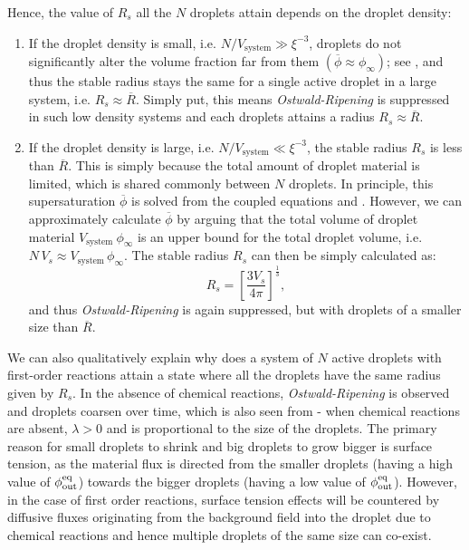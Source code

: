 Hence, the value of $R_s$ all the $N$ droplets attain depends on the droplet density:
\begin{enumerate}
    \item If the droplet density is small, i.e. $N / V_\mathrm{system} \gg \xi ^ {-3}$, droplets do not significantly alter the volume fraction far from them $(\overline{\phi} \approx \phi_\infty)$; see , and thus the stable radius stays the same for a single active droplet in a large system, i.e. $R_s \approx \overline{R}$.
    Simply put, this means \textit{Ostwald-Ripening} is suppressed in such low density systems and each droplets attains a radius $R_s \approx \overline{R}$.

    \item If the droplet density is large, i.e. $N / V_\mathrm{system} \ll \xi ^ {-3}$, the stable radius $R_s$ is less than $\overline{R}$. 
    This is simply because the total amount of droplet material is limited, which is shared commonly between $N$ droplets.
    In principle, this supersaturation $\overline{\phi}$ is solved from the coupled equations  and .
    However, we can approximately calculate $\overline{\phi}$ by arguing that the total volume of droplet material $V_\mathrm{system}~\phi_\infty$ is an upper bound for the total droplet volume, i.e. $N \, V_s \approx V_\mathrm{system} \, \phi_\infty$.
    The stable radius $R_s$ can then be simply calculated as:
    \begin{equation}
    \label{eqn:approx_stable_radius_finite}
        R_s = \left [\frac{3 V_s}{4 \pi}\right ]^{\frac{1}{3}},
    \end{equation}
    and thus \textit{Ostwald-Ripening} is again suppressed, but with droplets of a smaller size than $\overline{R}$.

\end{enumerate}
We can also qualitatively explain why does a system of $N$ active droplets with first-order reactions attain a state where all the droplets have the same radius given by $R_s$.
In the absence of chemical reactions, \textit{Ostwald-Ripening} is observed and droplets coarsen over time, which is also seen from  - when chemical reactions are absent, $\lambda > 0$ and is proportional to the size of the droplets.
The primary reason for small droplets to shrink and big droplets to grow bigger is surface tension, as the material flux is directed from the smaller droplets (having a high value of $\phi^\mathrm{eq}_\mathrm{out}$) towards the bigger droplets (having a low value of $\phi^\mathrm{eq}_\mathrm{out}$).
However, in the case of first order reactions, surface tension effects will be countered by diffusive fluxes originating from the background field into the droplet due to chemical reactions and hence multiple droplets of the same size can co-exist.

